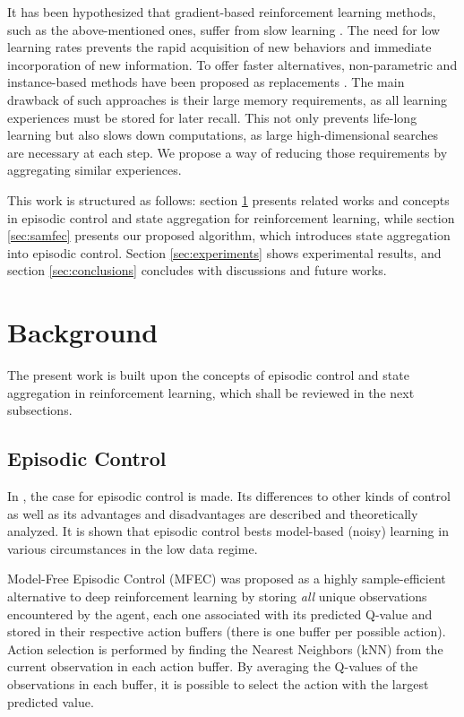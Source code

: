 \documentclass{article}
\begin{document}
It has been hypothesized that gradient-based reinforcement learning methods, such as the above-mentioned ones, suffer from slow learning \cite{botvinick2019reinforcement}. The need for low learning rates prevents the rapid acquisition of new behaviors and immediate incorporation of new information. To offer faster alternatives, non-parametric and instance-based methods have been proposed as replacements \cite{lengyel2008hippocampal, blundell2016model, gershman2017reinforcement, pritzel2017neural}. The main drawback of such approaches is their large memory requirements, as all learning experiences must be stored for later recall. This not only prevents life-long learning but also slows down computations, as large high-dimensional searches are necessary at each step. We propose a way of reducing those requirements by aggregating similar experiences.

This work is structured as follows: section \ref{sec:background} presents related works and concepts in episodic control and state aggregation for reinforcement learning, while section \ref{sec:samfec} presents our proposed algorithm, which introduces state aggregation into episodic control. Section \ref{sec:experiments} shows experimental results, and section \ref{sec:conclusions} concludes with discussions and future works.

\section{Background}
\label{sec:background}

The present work is built upon the concepts of episodic control and state aggregation in reinforcement learning, which shall be reviewed in the next subsections.

\subsection{Episodic Control}

In \cite{lengyel2008hippocampal}, the case for episodic control is made. Its differences to other kinds of control as well as its advantages and disadvantages are described and theoretically analyzed. It is shown that episodic control bests model-based (noisy) learning in various circumstances in the low data regime.

Model-Free Episodic Control (MFEC) \cite{blundell2016model} was proposed as a highly sample-efficient alternative to deep reinforcement learning \cite{mnih2013playing} by storing \emph{all} unique observations encountered by the agent, each one associated with its predicted Q-value and stored in their respective action buffers (there is one buffer per possible action). Action selection is performed by finding the  Nearest Neighbors (kNN) from the current observation in each action buffer. By averaging the Q-values of the  observations in each buffer, it is possible to select the action with the largest predicted value.
\end{document}
